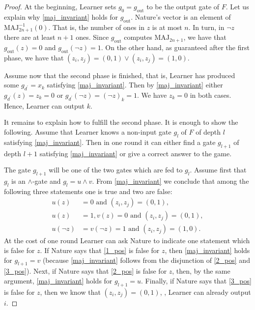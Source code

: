 \documentclass{toc}
\def\MAJ{\mathrm{MAJ}}
\begin{document}
\begin{proof}
At the beginning, Learner sets $g_0 = g_{\mathrm{out}}$ to be the output gate of $F$. Let us explain why \eqref{maj_invariant} holds for $g_{\mathrm{out}}$. Nature's vector is an element of $\MAJ_{2n + 1}^{-1}(0)$. That is, the number of ones in $z$ is at most $n$. In turn, in $\lnot z$ there are at least  $n + 1$ ones. Since  $g_{\mathrm{out}}$ computes $\MAJ_{2n + 1}$, we have that  $g_{\mathrm{out}}(z) = 0$ and $g_{\mathrm{out}}(\lnot z) = 1$. On the other hand, as %
guaranteed  %
after the first phase, we have that $(z_i, z_j) = (0,1) \lor (z_i,z_j) = (1,0)$.

Assume now that the second phase is finished, that is, Learner has produced some $g_{d^\prime} = x_k$ satisfying \eqref{maj_invariant}. Then by \eqref{maj_invariant} either $g_{d^\prime}(z) = z_k = 0$ or $g_{d^\prime}(\lnot z) = (\lnot z)_k = 1$. We have $z_k = 0$ in both cases. Hence, Learner can output $k$.

It remains to explain how to fulfill the second phase. It is enough to show the following. Assume that Learner knows a non-input gate $g_l$ of $F$ of depth $l$  satisfying \eqref{maj_invariant}. Then in one round it 
%
 can  either find a gate $g_{l + 1}$ of depth $l + 1$ satisfying \eqref{maj_invariant} or give a correct answer to the game.


The gate $g_{l + 1}$ will be one of the two gates which are fed to $g_l$.  Assume first that $g_l$ is an $\land$-gate and $g_l = u \land v$.
  From \eqref{maj_invariant} we conclude that among the following three statements one is true and two are false:
\begin{align}
\label{1_pos}
u(z) &= 0 \mbox{ and } (z_i, z_j) = (0,1), \\
\label{2_pos}
u(z) &= 1, v(z) = 0 \mbox{ and } (z_i, z_j) = (0,1),\\
\label{3_pos}
u(\lnot z) &= v(\lnot z) = 1 \mbox{ and } (z_i,z_j) = (1,0).
\end{align}
At the cost of one round Learner can ask Nature to indicate one 
statement which is false for $z$. %
If Nature says that \eqref{1_pos}
is false for $z$, %
then   \eqref{maj_invariant} holds for $g_{l + 1} = v$ (because \eqref{maj_invariant} follows from the disjunction of \eqref{2_pos} and \eqref{3_pos}). Next, if Nature says that \eqref{2_pos} is false for $z$, then, by the same argument, \eqref{maj_invariant} holds for $g_{l + 1} = u$. Finally, if Nature says that \eqref{3_pos} is false for $z$, then we know that $(z_i, z_j) = (0,1)$, \ie, Learner  can already output $i$.


\end{proof}
\end{document}
